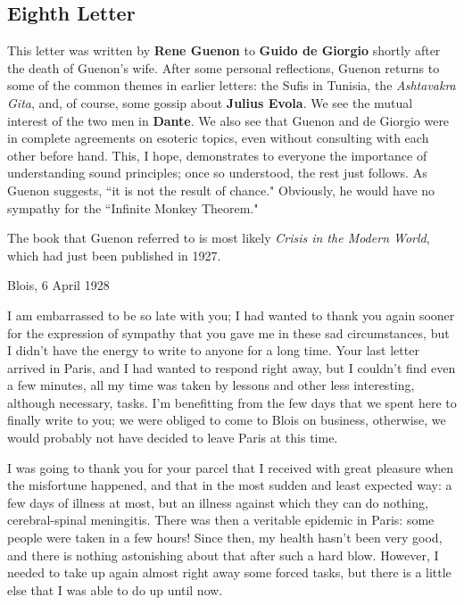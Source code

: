 \subsection{Eighth Letter}

\begin{quotex}
This letter was written by \textbf{Rene Guenon} to \textbf{Guido de Giorgio} shortly after the death of
Guenon's wife. After some personal reflections, Guenon returns to some of the common themes in
earlier letters: the Sufis in Tunisia, the \emph{Ashtavakra Gita}, and, of course, some gossip about \textbf{Julius
Evola}. We see the mutual interest of the two men in \textbf{Dante}. We also see that Guenon and de Giorgio were in
complete agreements on esoteric topics, even without consulting with each other before hand. This, I hope, demonstrates
to everyone the importance of understanding sound principles; once so understood, the rest just follows. As Guenon
suggests, ``it is not the result of chance." Obviously, he would have no sympathy for the ``Infinite Monkey Theorem."

The book that Guenon referred to is most likely \emph{Crisis in the Modern World}, which had just been published in
1927. 

\end{quotex}
Blois, 6 April 1928

I am embarrassed to be so late with you; I had wanted to thank you again sooner for the expression of sympathy that you
gave me in these sad circumstances, but I didn't have the energy to write to anyone for a long
time. Your last letter arrived in Paris, and I had wanted to respond right away, but I couldn't
find even a few minutes, all my time was taken by lessons and other less interesting, although necessary, tasks.
I'm benefitting from the few days that we spent here to finally write to you; we were obliged to
come to Blois on business, otherwise, we would probably not have decided to leave Paris at this time.

I was going to thank you for your parcel that I received with great pleasure when the misfortune happened, and that in
the most sudden and least expected way: a few days of illness at most, but an illness against which they can do
nothing, cerebral-spinal meningitis. There was then a veritable epidemic in Paris: some people were taken in a few
hours! Since then, my health hasn't been very good, and there is nothing astonishing about that
after such a hard blow. However, I needed to take up again almost right away some forced tasks, but there is a little
else that I was able to do up until now.


